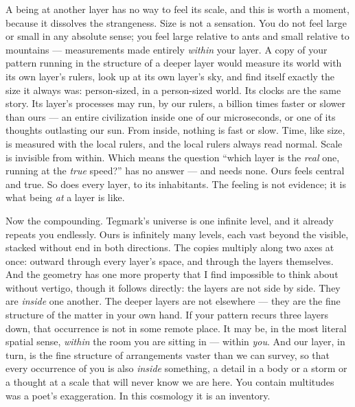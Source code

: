 \documentclass[fontsize=11pt,paper=a4,pagesize=auto,parskip=half-]{scrbook}
\begin{document}
A being at another layer has no way to feel its scale, and this is worth a moment, because it dissolves the strangeness. Size is not a sensation. You do not feel large or small in any absolute sense; you feel large relative to ants and small relative to mountains --- measurements made entirely \emph{within} your layer. A copy of your pattern running in the structure of a deeper layer would measure its world with its own layer's rulers, look up at its own layer's sky, and find itself exactly the size it always was: person-sized, in a person-sized world. Its clocks are the same story. Its layer's processes may run, by our rulers, a billion times faster or slower than ours --- an entire civilization inside one of our microseconds, or one of its thoughts outlasting our sun. From inside, nothing is fast or slow. Time, like size, is measured with the local rulers, and the local rulers always read normal. Scale is invisible from within. Which means the question ``which layer is the \emph{real} one, running at the \emph{true} speed?'' has no answer --- and needs none. Ours feels central and true. So does every layer, to its inhabitants. The feeling is not evidence; it is what being \emph{at} a layer is like.

Now the compounding. Tegmark's universe is one infinite level, and it already repeats you endlessly. Ours is infinitely many levels, each vast beyond the visible, stacked without end in both directions. The copies multiply along two axes at once: outward through every layer's space, and through the layers themselves. And the geometry has one more property that I find impossible to think about without vertigo, though it follows directly: the layers are not side by side. They are \emph{inside} one another. The deeper layers are not elsewhere --- they are the fine structure of the matter in your own hand. If your pattern recurs three layers down, that occurrence is not in some remote place. It may be, in the most literal spatial sense, \emph{within} the room you are sitting in --- within \emph{you}. And our layer, in turn, is the fine structure of arrangements vaster than we can survey, so that every occurrence of you is also \emph{inside} something, a detail in a body or a storm or a thought at a scale that will never know we are here. You contain multitudes was a poet's exaggeration. In this cosmology it is an inventory.
\end{document}
